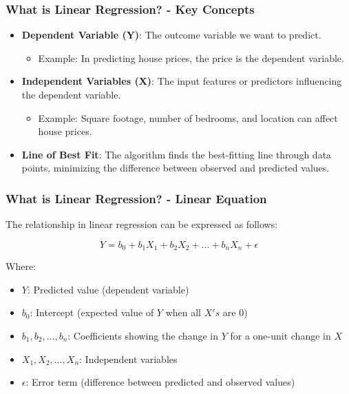 \documentclass[aspectratio=169]{beamer}
\begin{document}
\begin{frame}[fragile]
    \frametitle{What is Linear Regression? - Key Concepts}
    \begin{itemize}
        \item \textbf{Dependent Variable (Y)}: The outcome variable we want to predict. 
        \begin{itemize}
            \item Example: In predicting house prices, the price is the dependent variable.
        \end{itemize}
        
        \item \textbf{Independent Variables (X)}: The input features or predictors influencing the dependent variable.
        \begin{itemize}
            \item Example: Square footage, number of bedrooms, and location can affect house prices.
        \end{itemize}
        
        \item \textbf{Line of Best Fit}: The algorithm finds the best-fitting line through data points, minimizing the difference 
        between observed and predicted values.
    \end{itemize}
\end{frame}

\begin{frame}[fragile]
    \frametitle{What is Linear Regression? - Linear Equation}
    The relationship in linear regression can be expressed as follows:

    \begin{equation}
        Y = b_0 + b_1X_1 + b_2X_2 + ... + b_nX_n + \epsilon
    \end{equation}

    Where:
    \begin{itemize}
        \item \( Y \): Predicted value (dependent variable)
        \item \( b_0 \): Intercept (expected value of \( Y \) when all \( X's \) are 0)
        \item \( b_1, b_2, \ldots, b_n \): Coefficients showing the change in \( Y \) for a one-unit change in \( X \)
        \item \( X_1, X_2, \ldots, X_n \): Independent variables
        \item \( \epsilon \): Error term (difference between predicted and observed values)
    \end{itemize}
\end{frame}
\end{document}
